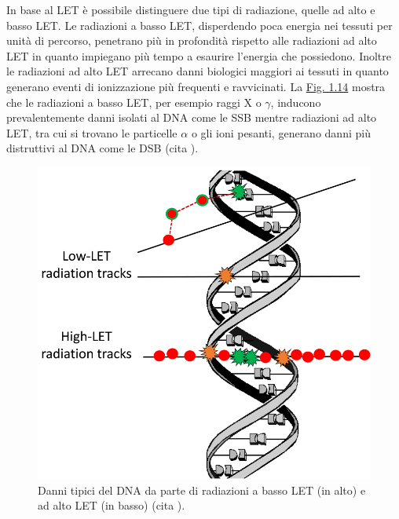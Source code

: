 \documentclass[12pt,a4paper,twoside]{report}
\begin{document}
	In base al LET è possibile distinguere due tipi di radiazione, quelle ad alto e basso LET. Le radiazioni a basso LET, disperdendo poca energia nei tessuti per unità di percorso, penetrano più in profondità rispetto alle radiazioni ad alto LET in quanto impiegano più tempo a esaurire l'energia che possiedono. Inoltre le radiazioni ad alto LET arrecano danni biologici maggiori ai tessuti in quanto generano eventi di ionizzazione più frequenti e ravvicinati. La \hyperref[fig:damage_let]{Fig. 1.14} mostra che le radiazioni a basso LET, per esempio raggi X o $\gamma$, inducono prevalentemente danni isolati al DNA come le SSB mentre radiazioni ad alto LET, tra cui si trovano le particelle $\alpha$ o gli ioni pesanti, generano danni più distruttivi al DNA come le DSB (cita
	).
	
	\begin{figure}[H]
		\centering
		\includegraphics[width=0.9\linewidth]{images/damage_let.png}
		\caption{Danni tipici del DNA da parte di radiazioni a basso LET (in alto) e ad alto LET (in basso) (cita
			).}
		\label{fig:damage_let}
	\end{figure}
	
\end{document}
